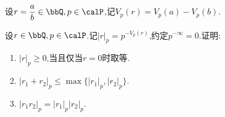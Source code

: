 \begin{deff}
    设$r=\dfrac{a}{b} \in \bbQ, p \in \calP$,记$V_p(r) = V_p(a) - V_p(b)$.
\end{deff}

\begin{exer}
    设$r \in \bbQ, p \in \calP$.记$\left\lvert r \right\rvert_p = p^{- V_p(r)}$,约定$p^{- \infty} = 0$.证明:
    \begin{enumerate}
        \item $\left\lvert r \right\rvert_p \geqslant 0$,当且仅当$r=0$时取等.
        \item $\left\lvert r_1 + r_2 \right\rvert_p \leqslant \max \{ \left\lvert r_1 \right\rvert_p, \left\lvert r_2 \right\rvert_p \}$.
        \item $\left\lvert r_1r_2 \right\rvert_p = \left\lvert r_1 \right\rvert_p \left\lvert r_2 \right\rvert_p$.
    \end{enumerate}
\end{exer}